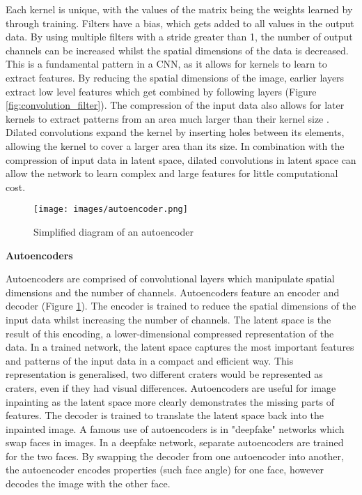 \documentclass[twocolumn]{article}
\begin{document}
Each kernel is unique, with the values of the matrix being the weights learned by through training.
Filters have a bias, which gets added to all values in the output data.
By using multiple filters with a stride greater than 1, the number of output channels can be increased whilst the spatial dimensions of the data is decreased.
This is a fundamental pattern in a CNN, as it allows for kernels to learn to extract features.
By reducing the spatial dimensions of the image, earlier layers extract low level features which get combined by following layers (Figure \ref{fig:convolution_filter}).
The compression of the input data also allows for later kernels to extract patterns from an area much larger than their kernel size .
Dilated convolutions expand the kernel by inserting holes between its elements, allowing the kernel to cover a larger area than its size\autocite{dumoulinGuideConvolutionArithmetic2018}.
In combination with the compression of input data in latent space, dilated convolutions in latent space can allow the network to learn complex and large features for little computational cost.


\begin{figure}[htbp]
\centering
\texttt{[image: images/autoencoder.png]}
\caption{\label{fig:autoencoder}Simplified diagram of an autoencoder\autocite{birlaAutoencoders2019}}
\end{figure}

\textbf{Autoencoders}

Autoencoders are comprised of convolutional layers which manipulate spatial dimensions and the number of channels.
Autoencoders feature an encoder and decoder (Figure \ref{fig:autoencoder}).
The encoder is trained to reduce the spatial dimensions of the input data whilst increasing the number of channels.
The latent space is the result of this encoding, a lower-dimensional compressed representation of the data.
In a trained network, the latent space captures the most important features and patterns of the input data in a compact and efficient way\autocite{michelucciIntroductionAutoencoders2022}.
This representation is generalised, two different craters would be represented as craters, even if they had visual differences.
Autoencoders are useful for image inpainting as the latent space more clearly demonstrates the missing parts of features.
The decoder is trained to translate the latent space back into the inpainted image.
A famous use of autoencoders is in "deepfake" networks which swap faces in images.
In a deepfake network, separate autoencoders are trained for the two faces.
By swapping the decoder from one autoencoder into another, the autoencoder encodes properties (such face angle) for one face, however decodes the image with the other face.
\end{document}
